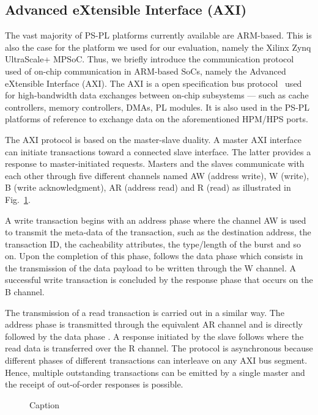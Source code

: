 \subsection{Advanced eXtensible Interface (AXI)}
\label{subsec:axi_transaction_scheme}
The vast majority of PS-PL platforms currently available are
ARM-based. This is also the case for the platform we used for our
evaluation, namely the Xilinx Zynq UltraScale+ MPSoC. Thus, we briefly
introduce the communication protocol used of on-chip communication in
ARM-based SoCs, namely the Advanced eXtensible Interface (AXI). The
AXI is a open specification bus protocol~\cite{ARM-AXI} used for
high-bandwidth data exchanges between on-chip subsystems --- such as
cache controllers, memory controllers, DMAs, PL modules. It is also
used in the PS-PL platforms of reference to exchange data on the
aforementioned HPM/HPS ports.

The AXI protocol is based on the master-slave duality. A master AXI
interface can initiate transactions toward a connected slave
interface.  The latter provides a response to master-initiated
requests.  Masters and the slaves communicate with each other through
five different channels named AW (address write), W (write), B (write
acknowledgment), AR (address read) and R (read) as illustrated in
Fig.~\ref{fig:axi_transaction_scheme_figure}.

A write transaction begins with an address phase  where the
channel AW is used to transmit the meta-data of the transaction, such
as the destination address, the transaction ID, the cacheability
attributes, the type/length of the burst and so on.  Upon the
completion of this phase, follows the data phase  which
consists in the transmission of the data payload to be written through
the W channel.  A successful write transaction is concluded by the
response phase  that occurs on the B channel.

The transmission of a read transaction is carried out in a similar
way.  The address phase  is transmitted through the
equivalent AR channel and is directly followed by the data phase
.  A response initiated by the slave follows where the
read data is transferred over the R channel. The protocol is
asynchronous because different phases of different transactions can
interleave on any AXI bus segment. Hence, multiple outstanding
transactions can be emitted by a single master and the receipt of
out-of-order responses is possible.

\begin{figure}
  \centering
  
  \caption{Caption}
  \label{fig:axi_transaction_scheme_figure}
\end{figure}
